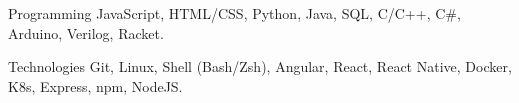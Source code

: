 

\begin{cvskills}

  \cvskill
    {Programming} %
    {JavaScript, HTML/CSS, Python, Java, SQL, C/C++, C\#,  Arduino, Verilog, Racket.} %

  \cvskill
    {Technologies} %
    {Git, Linux, Shell (Bash/Zsh), Angular, React, React Native, Docker, K8s, Express, npm, NodeJS.} %


\end{cvskills}
